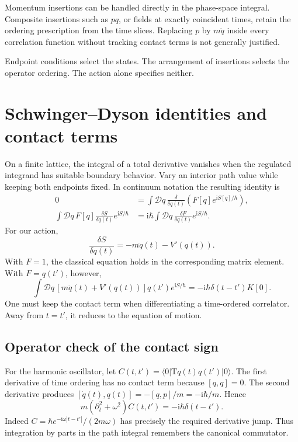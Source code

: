 \documentclass[11pt]{article}
\newcommand{\ii}{\mathrm i}
\newcommand{\D}{\mathcal D}
\newcommand{\Tord}{\mathrm T}
\newcommand{\module}[1]{\clearpage\section{#1}}
\begin{document}
Momentum insertions can be handled directly in the phase-space
integral. Composite insertions such as \(pq\), or fields at exactly
coincident times, retain the ordering prescription from the time
slices. Replacing \(p\) by \(m\dot q\) inside every correlation function
without tracking contact terms is not generally justified.

\begin{keyidea}
Endpoint conditions select the states. The arrangement of insertions
selects the operator ordering. The action alone specifies neither.
\end{keyidea}

\module{Schwinger--Dyson identities and contact terms}
On a finite lattice, the integral of a total derivative vanishes when
the regulated integrand has suitable boundary behavior. Vary an
interior path value while keeping both endpoints fixed. In continuum
notation the resulting identity is
\begin{align}
 0&=\int\D q\,\frac{\delta}{\delta q(t)}
       \left(F[q]e^{\ii S[q]/\hbar}\right),\\
 \int\D q\,F[q]\frac{\delta S}{\delta q(t)}e^{\ii S/\hbar}
 &=\ii\hbar\int\D q\,\frac{\delta F}{\delta q(t)}e^{\ii S/\hbar}.
                                                        \label{eq:sd}
\end{align}
For our action,
\begin{equation}
 \frac{\delta S}{\delta q(t)}=-m\ddot q(t)-V'(q(t)).
\end{equation}
With \(F=1\), the classical equation holds in the corresponding
matrix element. With \(F=q(t')\), however,
\begin{equation}
 \int\D q\,[m\ddot q(t)+V'(q(t))]q(t')e^{\ii S/\hbar}
 =-\ii\hbar\delta(t-t')K[0].                         \label{eq:contact}
\end{equation}
One must keep the contact term when differentiating a time-ordered
correlator. Away from \(t=t'\), it reduces to the equation of motion.

\subsection{Operator check of the contact sign}
For the harmonic oscillator, let
\(C(t,t')=\langle0|\Tord q(t)q(t')|0\rangle\).
The first derivative of time ordering has no contact term because
\([q,q]=0\). The second derivative produces
\([\dot q(t),q(t)]=-[q,p]/m=-\ii\hbar/m\). Hence
\begin{equation}
 m(\partial_t^2+\omega^2)C(t,t')=-\ii\hbar\delta(t-t').
\end{equation}
Indeed \(C=\hbar e^{-\ii\omega|t-t'|}/(2m\omega)\) has precisely
the required derivative jump. Thus integration by parts in the path
integral remembers the canonical commutator.
\end{document}
